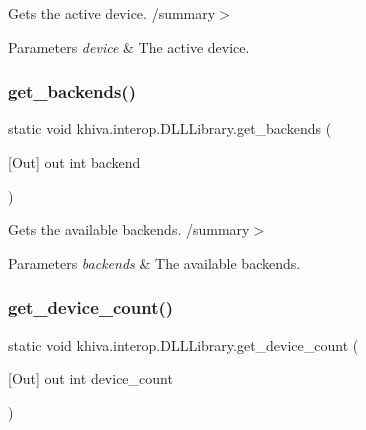 Gets the active device. /summary$>$ 
\begin{DoxyParams}{Parameters}
{\em device} & The active device.\\
\hline
\end{DoxyParams}


\mbox{\label{classkhiva_1_1interop_1_1_d_l_l_library_a9b85fc84cb87801da32b62119a58b710}} 
\subsubsection{\texorpdfstring{get\+\_\+backends()}{get\_backends()}}
{\footnotesize\ttfamily static void khiva.\+interop.\+D\+L\+L\+Library.\+get\+\_\+backends (\begin{DoxyParamCaption}\item[{\mbox{[}\+Out\mbox{]} out int}]{backend }\end{DoxyParamCaption})\hspace{0.3cm}{\ttfamily [static]}}



Gets the available backends. /summary$>$ 
\begin{DoxyParams}{Parameters}
{\em backends} & The available backends.\\
\hline
\end{DoxyParams}


\mbox{\label{classkhiva_1_1interop_1_1_d_l_l_library_a89897882221d9c471efa503eba37901a}} 
\subsubsection{\texorpdfstring{get\+\_\+device\+\_\+count()}{get\_device\_count()}}
{\footnotesize\ttfamily static void khiva.\+interop.\+D\+L\+L\+Library.\+get\+\_\+device\+\_\+count (\begin{DoxyParamCaption}\item[{\mbox{[}\+Out\mbox{]} out int}]{device\+\_\+count }\end{DoxyParamCaption})\hspace{0.3cm}{\ttfamily [static]}}



